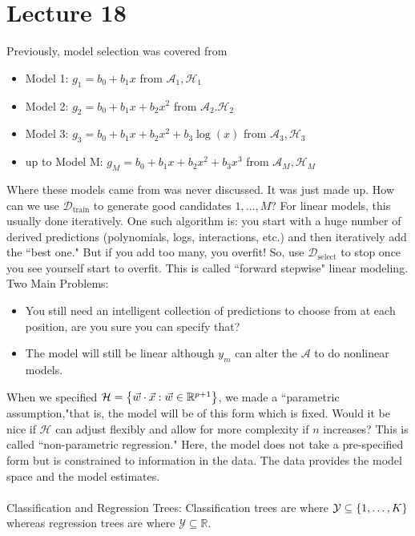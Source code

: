\documentclass[12pt]{article}
\begin{document}
\section{Lecture 18} 
Previously, model selection was covered from 
\begin{itemize} 
\item Model 1: $g_1 = b_0 + b_1x$ from $\mathcal{A}_1, \mathcal{H}_1$
\item Model 2: $g_2 = b_0 + b_1x + b_2x^2$ from $\mathcal{A}_2. \mathcal{H}_2$
\item Model 3: $g_3 = b_0 + b_1x + b_2x^2 + b_3\log(x)$ from $\mathcal{A}_3, \mathcal{H}_3$ 
\item up to Model M: $g_M = b_0 + b_1x + b_2x^2 + b_3x^3$ from $\mathcal{A}_M, \mathcal{H}_M$ \end{itemize} 
Where these models came from was never discussed. It was just made up. How can we use $\mathcal{D}_{\text{train}}$ to generate good candidates $1, \dots, M$? For linear models, this usually done iteratively. One such algorithm is: you start with a huge number of derived predictions (polynomials, logs, interactions, etc.) and then iteratively add the ``best one." But if you add too many, you overfit! So, use $\mathcal{D}_{\text{select}}$ to stop once you see yourself start to overfit. This is called ``forward stepwise" linear modeling. \\
Two Main Problems: \begin{itemize} 
\item You still need an intelligent collection of predictions to choose from at each position, are you sure you can specify that? 
\item The model will still be linear although $y_m$ can alter the $\mathcal{A}$ to do nonlinear models. \end{itemize} 
When we specified $\mathcal{H} = \left\{ \vec{w} \cdot \vec{x}: \vec{w} \in \mathbb{R}^{p+1} \right\}$, we made a ``parametric assumption,"that is, the model will be of this form which is fixed. Would it be nice if $\mathcal{H}$ can adjust flexibly and allow for more complexity if $n$ increases? This is called ``non-parametric regression." Here, the model does not take a pre-specified form but is constrained to information in the data. The data provides the model space and the model estimates. \\~\\
Classification and Regression Trees: Classification trees are where $\mathcal{Y} \subseteq \left\{ 1,\dots, K \right\}$ whereas regression trees are where $\mathcal{Y} \subseteq \mathbb{R}$. \\
\end{document}

